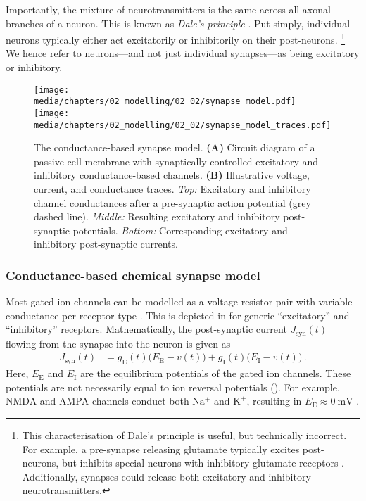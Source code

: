 Importantly, the mixture of neurotransmitters is the same across all axonal branches of a neuron.
This is known as \emph{Dale's principle} \citep{strata1999dale,eccles1986chemical}.
Put simply, individual neurons typically either act excitatorily or inhibitorily on their post-neurons.%
\footnote{This characterisation of Dale's principle is useful, but technically incorrect. For example, a pre-synapse releasing glutamate typically excites post-neurons, but inhibits special neurons with inhibitory glutamate receptors \citep{cleland1996inhibitory}.
Additionally, synapses could release both excitatory and inhibitory neurotransmitters.
}
We hence refer to neurons---and not just individual synapses---as being excitatory or inhibitory.

\begin{figure}
	\centering
	\texttt{[image: media/chapters/02\_modelling/02\_02/synapse\_model.pdf]}%
	\texttt{[image: media/chapters/02\_modelling/02\_02/synapse\_model\_traces.pdf]}%
	{\label{fig:synapse_model_circuit}}%
	{\label{fig:synapse_model_traces}}%
	\caption[The conductance-based synapse model]{The conductance-based synapse model.
	\textbf{(A)} Circuit diagram of a passive cell membrane with synaptically controlled excitatory and inhibitory conductance-based channels.
	\textbf{(B)} Illustrative voltage, current, and conductance traces. \emph{Top:} Excitatory and inhibitory channel conductances after a pre-synaptic action potential (grey dashed line). \emph{Middle:} Resulting excitatory and inhibitory post-synaptic potentials. \emph{Bottom:} Corresponding excitatory and inhibitory post-synaptic currents.}
	\label{fig:synapse_model}
\end{figure}

\subsubsection{Conductance-based chemical synapse model}
Most gated ion channels can be modelled as a voltage-resistor pair with variable conductance per receptor type \citep{roth2009modeling}.
This is depicted in  for generic \enquote{excitatory} and \enquote{inhibitory} receptors.
Mathematically, the post-synaptic current $J_\mathrm{syn}(t)$ flowing from the synapse into the neuron is given as
\begin{align}
	J_\mathrm{syn}(t) &=
		  g_\mathrm{E}(t) \bigl(E_\mathrm{E} - v(t)\bigr)
		+ g_\mathrm{I}(t) \bigl(E_\mathrm{I} - v(t)\bigr) \,.
	\label{eqn:conductance_synapse}
\end{align}
Here, $E_\mathrm{E}$ and $E_\mathrm{I}$ are the equilibrium potentials of the gated ion channels.
These potentials are not necessarily equal to ion reversal potentials ().
For example, NMDA and AMPA channels conduct both $\mathrm{Na^+}$ and $\mathrm{K^+}$, resulting in $E_\mathrm{E} \approx \SI{0}{\milli\volt}$ \citep[Chapter~10]{kandel2012principles}.

